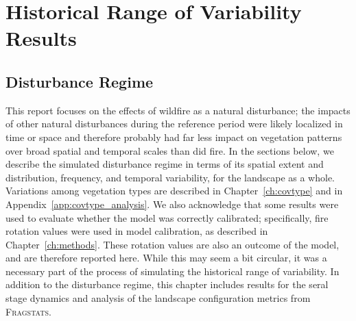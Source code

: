 
\chapter{Historical Range of Variability Results}

\section{Disturbance Regime}

This report focuses on the effects of wildfire as a natural disturbance; the impacts of other natural disturbances during the reference period were likely localized in time or space and therefore probably had far less impact on vegetation patterns over broad spatial and temporal scales than did fire. In the sections below, we describe the simulated disturbance regime in terms of its spatial extent and distribution, frequency, and temporal variability, for the landscape as a whole. Variations among vegetation types are described in Chapter~\ref{ch:covtype} and in Appendix~\ref{app:covtype_analysis}. We also acknowledge that some results were used to evaluate whether the model was correctly calibrated; specifically, fire rotation values were used in model calibration, as described in Chapter~\ref{ch:methods}. These rotation values are also an outcome of the model, and are therefore reported here. While this may seem a bit circular, it was a necessary part of the process of simulating the historical range of variability. In addition to the disturbance regime, this chapter includes results for the seral stage dynamics and analysis of the landscape configuration metrics from \textsc{Fragstats}.


